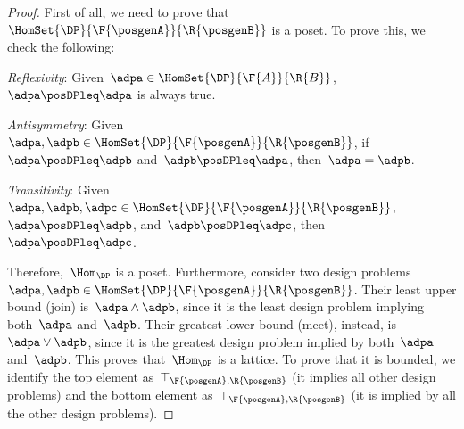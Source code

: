 \begin{proof}
  First of all, we need to prove that~$\HomSet{\DP}{\F{\posgenA}}{\R{\posgenB}}$ is a poset. To prove this, we check the following:

  \begin{compactitem}
    \item \emph{Reflexivity}: Given~$\adpa\in \HomSet{\DP}{\F{A}}{\R{B}}$,~$\adpa\posDPleq \adpa$ is always true.
    \item \emph{Antisymmetry}: Given~$\adpa,\adpb\in \HomSet{\DP}{\F{\posgenA}}{\R{\posgenB}}$, if~$\adpa\posDPleq \adpb$ and~$\adpb\posDPleq \adpa$, then~$\adpa=\adpb$.
    \item \emph{Transitivity}: Given~$\adpa,\adpb,\adpc\in \HomSet{\DP}{\F{\posgenA}}{\R{\posgenB}}$,~$\adpa\posDPleq \adpb$, and~$\adpb\posDPleq \adpc$, then~$\adpa\posDPleq \adpc$.
  \end{compactitem}
  Therefore,~$\Hom_\DP$ is a poset.
  Furthermore, consider two design problems~$\adpa,\adpb\in \HomSet{\DP}{\F{\posgenA}}{\R{\posgenB}}$.
  Their least upper bound (join) is~$\adpa\wedge \adpb$, since it is the least design problem implying both~$\adpa$ and~$\adpb$.
  Their greatest lower bound (meet), instead, is~$\adpa\vee \adpb$, since it is the greatest design problem implied by both~$\adpa$ and~$\adpb$.
  This proves that~$\Hom_\DP$ is a lattice.
  To prove that it is bounded, we identify the top element as~$\top_{\F{\posgenA},\R{\posgenB}}$ (it implies all other design problems) and the bottom element as~$\top_{\F{\posgenA},\R{\posgenB}}$ (it is implied by all the other design problems).
\end{proof}

